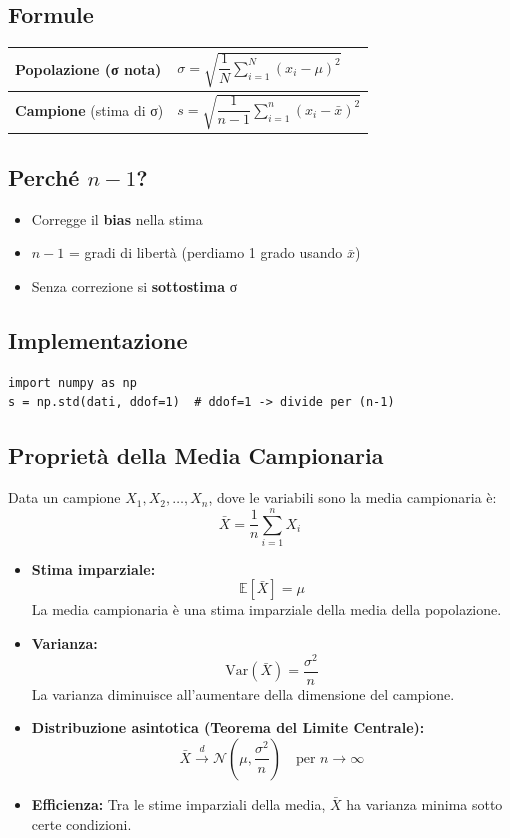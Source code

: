 \documentclass{article}
\begin{document}
\subsection*{Formule}
\begin{tabular}{|l|l|}
\hline
\textbf{Popolazione} (σ nota) & $\sigma = \sqrt{\dfrac{1}{N}\sum\limits_{i=1}^N (x_i - \mu)^2}$ \\
\hline
\textbf{Campione} (stima di σ) & $s = \sqrt{\dfrac{1}{n-1}\sum\limits_{i=1}^n (x_i - \bar{x})^2}$ \\
\hline
\end{tabular}

\subsection*{Perché $n-1$?}
\begin{itemize}
    \item Corregge il \textbf{bias} nella stima
    \item $n-1$ = gradi di libertà (perdiamo 1 grado usando $\bar{x}$)
    \item Senza correzione si \textbf{sottostima} σ
\end{itemize}

\subsection*{Implementazione}
\begin{lstlisting}
import numpy as np
s = np.std(dati, ddof=1)  # ddof=1 -> divide per (n-1)
\end{lstlisting}

\subsection*{Proprietà della Media Campionaria}

Data un campione $X_1, X_2, \dots, X_n$, dove le variabili sono  la media campionaria è:
\[
\bar{X} = \frac{1}{n} \sum_{i=1}^{n} X_i
\]

\begin{itemize}
  \item \textbf{Stima imparziale:} 
  \[
  \mathbb{E}[\bar{X}] = \mu
  \]
  La media campionaria è una stima imparziale della media della popolazione.

  \item \textbf{Varianza:}
  \[
  \mathrm{Var}(\bar{X}) = \frac{\sigma^2}{n}
  \]
  La varianza diminuisce all'aumentare della dimensione del campione.

  \item \textbf{Distribuzione asintotica (Teorema del Limite Centrale):}
  \[
  \bar{X} \xrightarrow{d} \mathcal{N} \left( \mu, \frac{\sigma^2}{n} \right) \quad \text{per } n \to \infty
  \]

  \item \textbf{Efficienza:} 
  Tra le stime imparziali della media, $\bar{X}$ ha varianza minima sotto certe condizioni.
\end{itemize}
\end{document}
